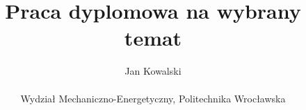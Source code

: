 \documentclass[12pt,a4paper]{book}
\begin{document}
\title{Praca dyplomowa na wybrany temat} %
\author{Jan Kowalski \\
	\\
	Wydział Mechaniczno-Energetyczny, Politechnika Wrocławska \\
	}

\maketitle 


\tableofcontents







%
%






\end{document}
